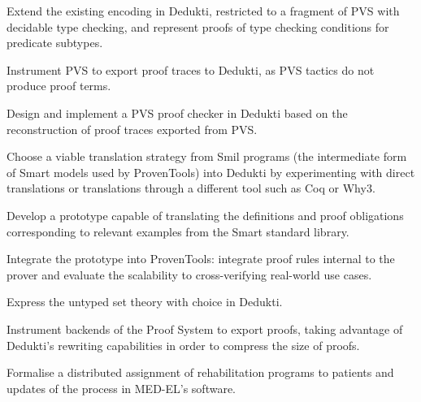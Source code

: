\begin{workpackage}
\begin{tasklist}
\begin{task}[id=pvs,
  title=Express the theory of PVS in Dedukti,
  shorttitle=PVS,
  lead=Inr,   %
  InrRM=20,  %
  wphases=1-48,
  ]
  \vspace{-5mm}
  \begin{compactitem}
  \item Extend the existing encoding in Dedukti,
    restricted to a fragment of PVS with decidable type checking, and represent
    proofs of type checking conditions for predicate subtypes.
  \item Instrument PVS to export proof traces to Dedukti, as PVS 
    tactics do not produce proof terms.
  \item Design and implement a PVS proof checker in Dedukti based on the
    reconstruction of proof traces exported from PVS.
  \end{compactitem}
\end{task}

\begin{task}[id=smart,
  title=Express Smart models and proofs in Dedukti,
  shorttitle=Smart,
  lead=Pro,   %
  ProRM=11,
  wphases=1-48,
  ]
  \vspace{-5mm}
  \begin{compactitem}
  \item Choose a viable translation strategy from Smil programs (the
    intermediate form of Smart models used by ProvenTools) into Dedukti
    by experimenting with direct translations or translations through a
    different tool such as Coq or Why3.
  \item Develop a prototype capable of translating the definitions and proof
    obligations corresponding to relevant examples from the Smart
    standard library.
  \item Integrate the prototype into ProvenTools: integrate proof rules internal
    to the prover and evaluate the scalability to cross-verifying real-world use
    cases.
  \end{compactitem}
\end{task}

\begin{task}[id=tla,
  title=Express the theory of \tlaplus in Dedukti,
  shorttitle=\tlaplus,
  lead=Inr,   %
  InrRM=21,   %
  MedRM=5,
  wphases=1-48,
  ]
  \vspace{-5mm}
  \begin{compactitem}
  \item Express the untyped \tlaplus set theory with choice in
    Dedukti.
  \item Instrument backends of the \tlaplus Proof System to export proofs,
    taking advantage of Dedukti's rewriting capabilities in order to compress
    the size of proofs.
  \item Formalise a distributed assignment of rehabilitation programs to
    patients and updates of the process in MED-EL's software.
  \end{compactitem}
\end{task}


\end{tasklist}
\end{workpackage}
